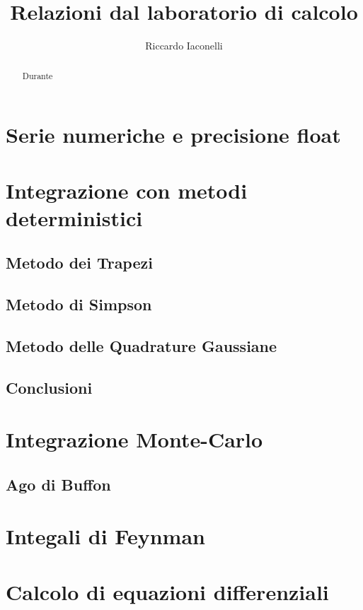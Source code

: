 \documentclass[a4paper,10pt]{article}
\title{Relazioni dal laboratorio di calcolo}
\author{Riccardo Iaconelli}
\begin{document}
\maketitle

\begin{abstract}
Durante
\end{abstract}

\section{Serie numeriche e precisione float}
\section{Integrazione con metodi deterministici}
\subsection{Metodo dei Trapezi}
\subsection{Metodo di Simpson}
\subsection{Metodo delle Quadrature Gaussiane}
\subsection{Conclusioni}

\section{Integrazione Monte-Carlo}
\subsection{Ago di Buffon}

\section{Integali di Feynman}

\section{Calcolo di equazioni differenziali}
\end{document}
